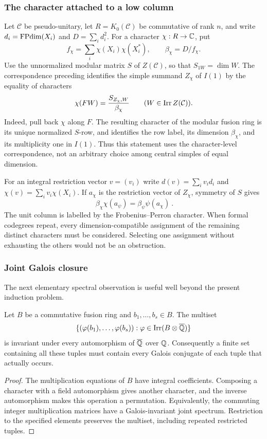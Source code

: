 \subsubsection{The character attached to a low column}
Let $\mathcal C$ be pseudo-unitary, let $R=K_0(\mathcal C)$ be
commutative of rank $n$, and write $d_i=\operatorname{FPdim}(X_i)$ and
$D=\sum_i d_i^2$. For a character $\chi:R\to\mathbb C$, put
\[
 f_\chi=\sum_i\chi(X_i)\chi(X_i^*),\qquad
 \beta_\chi=D/f_\chi.
\]
Use the unnormalized modular matrix $S$ of $Z(\mathcal C)$, so that
$S_{1W}=\dim W$. The correspondence preceding
\cite[Theorem~2.13]{Ostrik3} identifies the simple summand $Z_\chi$ of
$I(1)$ by the equality of characters
\begin{equation}\label{eq:central-character}
 \chi(FW)=\frac{S_{Z_\chi,W}}{\beta_\chi}
 \qquad(W\in\operatorname{Irr} Z(\mathcal C)).
\end{equation}
Indeed, pull back $\chi$ along $F$. The resulting character of the
modular fusion ring is its unique normalized $S$-row, and
\cite[Theorem~2.13]{Ostrik3} identifies the row label, its dimension
$\beta_\chi$, and its multiplicity one in $I(1)$. Thus this statement
uses the character-level correspondence, not an arbitrary choice among
central simples of equal dimension.

For an integral restriction vector $v=(v_i)$ write
$d(v)=\sum_i v_i d_i$ and $\chi(v)=\sum_i v_i\chi(X_i)$.
If $a_\chi$ is the restriction vector of $Z_\chi$, symmetry of $S$
gives
\begin{equation}\label{eq:character-reciprocity}
 \boxed{\ \beta_\chi\chi(a_\psi)
             =\beta_\psi\psi(a_\chi)\ }.
\end{equation}
The unit column is labelled by the Frobenius--Perron character. When
formal codegrees repeat, every dimension-compatible assignment of the
remaining distinct characters must be considered. Selecting one
assignment without exhausting the others would not be an obstruction.

\subsubsection{Joint Galois closure}
The next elementary spectral observation is useful well beyond the
present induction problem.
\begin{lemma}\label{lem:joint-spectrum}
Let $B$ be a commutative fusion ring and $b_1,\ldots,b_s\in B$.
The multiset
\[
 \{(\varphi(b_1),\ldots,\varphi(b_s)):
                    \varphi\in\operatorname{Irr}(B\otimes\overline{\mathbb Q})\}
\]
is invariant under every automorphism of $\overline{\mathbb Q}$ over $\mathbb Q$.
Consequently a finite set containing all these tuples must contain
every Galois conjugate of each tuple that actually occurs.
\end{lemma}
\begin{proof}
The multiplication equations of $B$ have integral coefficients. Composing
a character with a field automorphism gives another character, and the
inverse automorphism makes this operation a permutation. Equivalently,
the commuting integer multiplication matrices have a Galois-invariant
joint spectrum. Restriction to the specified elements preserves the
multiset, including repeated restricted tuples.
\end{proof}

